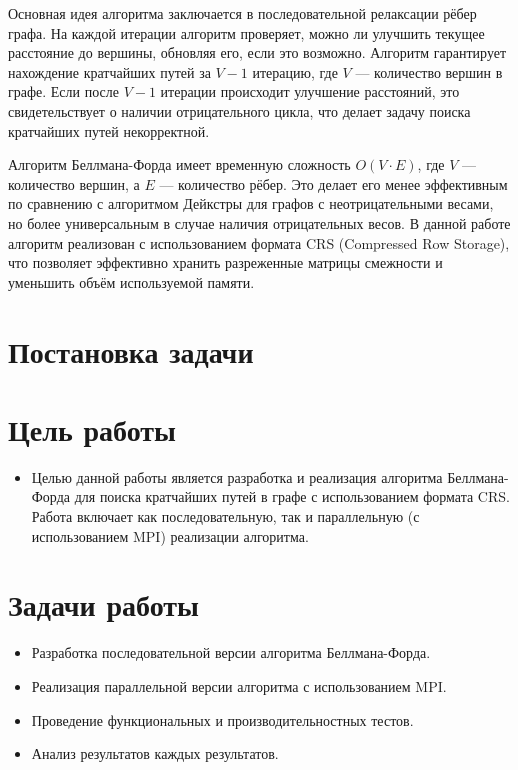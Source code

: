 \documentclass[12pt]{article}
\begin{document}
Основная идея алгоритма заключается в последовательной релаксации рёбер графа. На каждой итерации алгоритм проверяет, можно ли улучшить текущее расстояние до вершины, обновляя его, если это возможно. Алгоритм гарантирует нахождение кратчайших путей за \( V - 1 \) итерацию, где \( V \) — количество вершин в графе. Если после \( V - 1 \) итерации происходит улучшение расстояний, это свидетельствует о наличии отрицательного цикла, что делает задачу поиска кратчайших путей некорректной.

Алгоритм Беллмана-Форда имеет временную сложность \( O(V \cdot E) \), где \( V \) — количество вершин, а \( E \) — количество рёбер. Это делает его менее эффективным по сравнению с алгоритмом Дейкстры для графов с неотрицательными весами, но более универсальным в случае наличия отрицательных весов. В данной работе алгоритм реализован с использованием формата CRS (Compressed Row Storage), что позволяет эффективно хранить разреженные матрицы смежности и уменьшить объём используемой памяти.

\section*{Постановка задачи}

\section*{Цель работы}

\begin{itemize}
    \item Целью данной работы является разработка и реализация алгоритма Беллмана-Форда для поиска кратчайших путей в графе с использованием формата CRS. Работа включает как последовательную, так и параллельную (с использованием MPI) реализации алгоритма.
\end{itemize}

\section*{Задачи работы}

\begin{itemize}
    \item Разработка последовательной версии алгоритма Беллмана-Форда.
    \item Реализация параллельной версии алгоритма с использованием MPI.
    \item Проведение функциональных и производительностных тестов.
    \item Анализ результатов каждых результатов.
\end{itemize}
\end{document}
